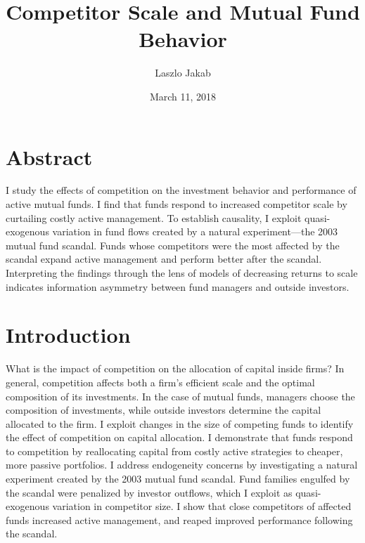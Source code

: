 \documentclass[]{book}
\title{Competitor Scale and Mutual Fund Behavior}
\author{Laszlo Jakab}
\date{March 11, 2018}
\theoremstyle{definition}
\theoremstyle{definition}
\theoremstyle{definition}
\theoremstyle{remark}
\begin{document}
\maketitle

{
\setcounter{tocdepth}{1}
\tableofcontents
}
\hypertarget{abstract}{%
\chapter*{Abstract}\label{abstract}}

I study the effects of competition on the investment behavior and
performance of active mutual funds. I find that funds respond to
increased competitor scale by curtailing costly active management. To
establish causality, I exploit quasi-exogenous variation in fund flows
created by a natural experiment---the 2003 mutual fund scandal. Funds
whose competitors were the most affected by the scandal expand active
management and perform better after the scandal. Interpreting the
findings through the lens of models of decreasing returns to scale
indicates information asymmetry between fund managers and outside
investors.

\hypertarget{introduction}{%
\chapter{Introduction}\label{introduction}}

What is the impact of competition on the allocation of capital inside
firms? In general, competition affects both a firm's efficient scale and
the optimal composition of its investments. In the case of mutual funds,
managers choose the composition of investments, while outside investors
determine the capital allocated to the firm. I exploit changes in the
size of competing funds to identify the effect of competition on capital
allocation. I demonstrate that funds respond to competition by
reallocating capital from costly active strategies to cheaper, more
passive portfolios. I address endogeneity concerns by investigating a
natural experiment created by the 2003 mutual fund scandal. Fund
families engulfed by the scandal were penalized by investor outflows,
which I exploit as quasi-exogenous variation in competitor size. I show
that close competitors of affected funds increased active management,
and reaped improved performance following the scandal.
\end{document}
